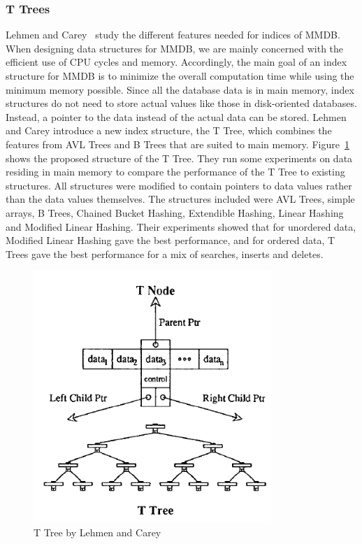 \documentclass[12pt,a4paper]{article}
\begin{document}
\subsubsection*{T Trees}
Lehmen and Carey~\cite{lehman1986study} study the different features needed for indices of MMDB. When designing data structures for MMDB, we are mainly concerned with the efficient use of CPU cycles and memory. Accordingly, the main goal of an index structure for MMDB is to minimize the overall computation time while using the minimum memory possible. Since all the database data is in main memory, index structures do not need to store actual values like those in disk-oriented databases. Instead, a pointer to the data instead of the actual data can be stored. Lehmen and Carey introduce a new index structure, the T Tree, which combines the features from AVL Trees and B Trees that are suited to main memory. Figure~\ref{fig:ttree} shows the proposed structure of the T Tree. They run some experiments on data residing in main memory to compare the performance of the T Tree to existing structures. All structures were modified to contain pointers to data values rather than the data values themselves. The structures included were  AVL Trees, simple arrays, B Trees, Chained Bucket Hashing, Extendible Hashing, Linear Hashing and Modified Linear Hashing. Their experiments showed that for unordered data, Modified Linear Hashing gave the best performance, and for ordered data, T Trees gave the best performance for a mix of searches, inserts and deletes.


\begin{figure}[!t]
\centering
\includegraphics[width=9cm]{figs/Ttree.png}
\caption{T Tree by Lehmen and Carey~\cite{lehman1986study}}
\label{fig:ttree}
\end{figure}
\end{document}
